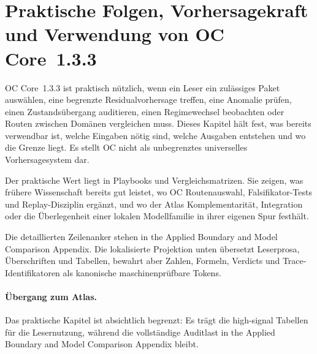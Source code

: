 \section{Praktische Folgen, Vorhersagekraft und Verwendung von OC Core~1.3.3}
\label{sec:oc-core-1-3-practical-utility}
\label{sec:oc-core-1-3-practical-utility-de}

OC Core~1.3.3 ist praktisch nützlich, wenn ein Leser ein zulässiges Paket
auswählen, eine begrenzte Residualvorhersage treffen, eine Anomalie prüfen,
einen Zustandsübergang auditieren, einen Regimewechsel beobachten oder Routen
zwischen Domänen vergleichen muss. Dieses Kapitel hält fest, was bereits
verwendbar ist, welche Eingaben nötig sind, welche Ausgaben entstehen und wo
die Grenze liegt. Es stellt OC nicht als unbegrenztes universelles
Vorhersagesystem dar.

Der praktische Wert liegt in Playbooks und Vergleichsmatrizen. Sie zeigen, was
frühere Wissenschaft bereits gut leistet, wo OC Routenauswahl,
Falsifikator-Tests und Replay-Disziplin ergänzt, und wo der Atlas
Komplementarität, Integration oder die Überlegenheit einer lokalen Modellfamilie
in ihrer eigenen Spur festhält.

Die detaillierten Zeilenanker stehen in
the Applied Boundary and Model Comparison Appendix. Die lokalisierte
Projektion unten übersetzt Leserprosa, Überschriften und Tabellen, bewahrt aber
Zahlen, Formeln, Verdicts und Trace-Identifikatoren als kanonische
maschinenprüfbare Tokens.

\begingroup
\small

\endgroup

\paragraph{Übergang zum Atlas.}
Das praktische Kapitel ist absichtlich begrenzt: Es trägt die high-signal
Tabellen für die Lesernutzung, während die vollständige Auditlast in
the Applied Boundary and Model Comparison Appendix bleibt.
